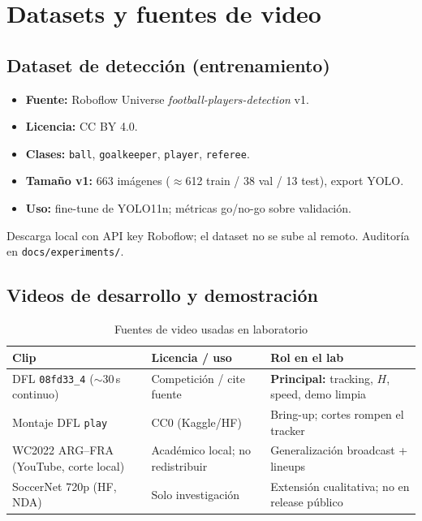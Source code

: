 \documentclass[11pt,a4paper]{article}
\begin{document}
\section{Datasets y fuentes de video}
\label{sec:datos}

\subsection{Dataset de detección (entrenamiento)}

\begin{itemize}[leftmargin=*,itemsep=2pt]
  \item \textbf{Fuente:} Roboflow Universe \emph{football-players-detection} v1.
  \item \textbf{Licencia:} CC BY 4.0.
  \item \textbf{Clases:} \texttt{ball}, \texttt{goalkeeper}, \texttt{player}, \texttt{referee}.
  \item \textbf{Tamaño v1:} 663 imágenes ($\approx$612 train / 38 val / 13 test), export YOLO.
  \item \textbf{Uso:} fine-tune de YOLO11n; métricas go/no-go sobre validación.
\end{itemize}

Descarga local con API key Roboflow; el dataset no se sube al remoto. Auditoría en \texttt{docs/experiments/}.

\subsection{Videos de desarrollo y demostración}

\begin{table}[ht]
\centering
\caption{Fuentes de video usadas en laboratorio}
\label{tab:videos}
\begin{tabular}{@{}p{3.8cm}p{3.2cm}p{5.5cm}@{}}
\toprule
\textbf{Clip} & \textbf{Licencia / uso} & \textbf{Rol en el lab} \\
\midrule
DFL \texttt{08fd33\_4} ($\sim$30\,s continuo) & Competición / cite fuente & \textbf{Principal:} tracking, $H$, speed, demo limpia \\
Montaje DFL \texttt{play} & CC0 (Kaggle/HF) & Bring-up; cortes rompen el tracker \\
WC2022 ARG--FRA (YouTube, corte local) & Académico local; no redistribuir & Generalización broadcast + lineups \\
SoccerNet 720p (HF, NDA) & Solo investigación & Extensión cualitativa; no en release público \\
\bottomrule
\end{tabular}
\end{table}
\end{document}
